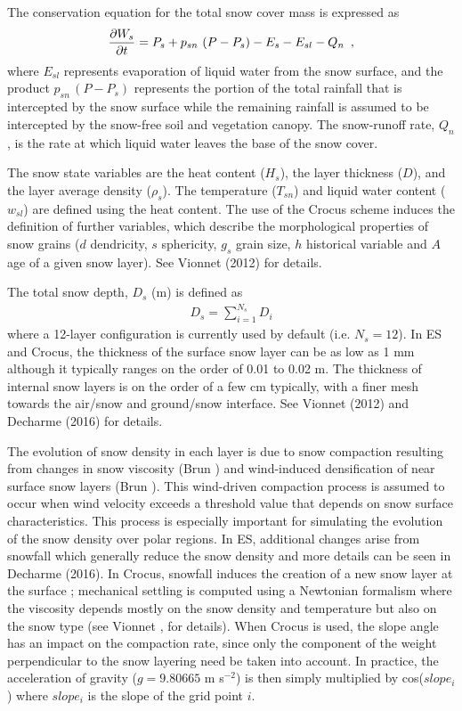 The conservation equation for the total snow cover mass
is expressed as
%
\begin{eqnarray}
{\partial W_s \over \partial t} =
P_s + p_{sn}\,\left(P-P_s\right) - E_{s} - E_{sl} - Q_n
\,\,\,,
\end{eqnarray}
%
where $E_{sl}$ represents evaporation of liquid water
from the snow surface, and the product $p_{sn}\,\left(P-P_s\right)$
represents the portion of the total rainfall that is
intercepted by the snow surface while the remaining
rainfall is assumed to be intercepted by the snow-free soil and vegetation
canopy. The snow-runoff rate, $Q_n$,
is the rate at which
liquid water leaves the base of the snow cover.


The snow state variables are the heat content ($H_s$),
the layer thickness ($D$), and the layer average density ($\rho_s$).
The temperature ($T_{sn}$) and liquid water content ($w_{sl}$) are defined
using the heat content.
The use of the Crocus scheme induces the definition of further variables, 
which describe the morphological properties of snow grains ($d$ dendricity, $s$ sphericity, 
$g_s$ grain size, $h$ historical variable and $A$ age of a given snow layer). 
See Vionnet \etal (2012) for details.

The total snow depth, $D_s$ (m) is defined as
%
\begin{eqnarray}
D_s = \sum_{i=1}^{N_s} D_i
\end{eqnarray}
%
where a 12-layer configuration is currently used by default (i.e. $N_s=12$). 
In ES and Crocus, the thickness of the surface snow layer can be
as low as 1 mm although it typically ranges on the order of 0.01 to 0.02 m.
The thickness of internal snow layers is on the order of a
few cm typically, with a finer mesh towards the air/snow and
ground/snow interface. See Vionnet \etal (2012) and Decharme \etal
(2016) for details.

The evolution of snow density in each layer is due to snow compaction
resulting from changes in snow viscosity (Brun ) and
wind-induced densification of near surface snow layers  
(Brun ). This wind-driven compaction process is assumed to occur
when wind velocity exceeds a threshold value that depends on snow
surface characteristics. This process is especially important for
simulating the evolution of the snow density over polar regions. 
%
In ES, additional changes arise from snowfall which generally reduce the
snow density and more details can be seen in Decharme \etal (2016). In
Crocus, snowfall induces the creation of a new snow layer at the
surface ; mechanical settling is computed using a Newtonian formalism
where the viscosity depends mostly on the snow density and temperature
but also on the snow type (see Vionnet , for
details). When Crocus is used, the slope angle has an impact on the
compaction rate, since only the component of the weight perpendicular
to the snow layering need be taken into account. In practice, the
acceleration of gravity ($g=9.80665$ m s$^{-2}$) is then simply multiplied
by cos($slope_i$) where $slope_i$ is the slope of the grid point $i$.


